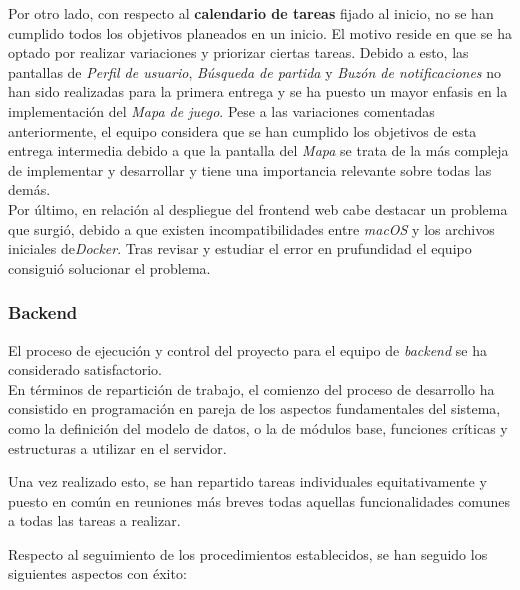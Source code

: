 \documentclass[11pt, a4paper, titlepage]{article}
\begin{document}
Por otro lado, con respecto al \textbf{calendario de tareas} fijado al inicio, no se han cumplido todos los objetivos planeados en un inicio. El motivo reside  en que se ha optado por realizar variaciones y priorizar ciertas tareas.
Debido a esto, las pantallas de \textit{Perfil de usuario}, \textit{Búsqueda de partida} y \textit{Buzón de notificaciones} no han sido realizadas para la primera entrega y se ha puesto un mayor enfasis en la implementación del \textit{Mapa de juego}. 
Pese a las variaciones comentadas anteriormente, el equipo considera que se han cumplido los objetivos de esta entrega intermedia debido a que la pantalla del \textit{Mapa} se trata de la más compleja de implementar y desarrollar y tiene una importancia relevante sobre todas las demás. \\

Por último, en relación al despliegue del frontend web cabe destacar un problema que surgió, debido a que existen incompatibilidades entre \textit{macOS} y los archivos iniciales de\textit{Docker}. Tras revisar y estudiar el error en prufundidad el equipo consiguió solucionar el problema. 
\subsubsection{Backend}

El proceso de ejecución y control del proyecto para el equipo de \textit{backend} se ha considerado satisfactorio.\\


En términos de repartición de trabajo, el comienzo del proceso de desarrollo ha consistido en programación en pareja de los aspectos fundamentales del sistema, como la definición del modelo de datos, o la de módulos base, funciones críticas y estructuras a utilizar en el servidor.

Una vez realizado esto, se han repartido tareas individuales equitativamente y puesto en común en reuniones más breves todas aquellas funcionalidades comunes a todas las tareas a realizar.


Respecto al seguimiento de los procedimientos establecidos, se han seguido los siguientes aspectos con éxito:
\end{document}
